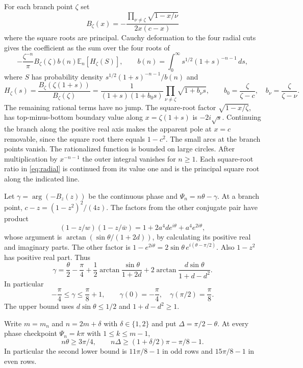 \documentclass[11pt]{article}
\begin{document}
For each branch point $\zeta$ set
\[
B_\zeta(x)=-\frac{\prod_{\nu\ne\zeta}\sqrt{1-x/\nu}}{2x(c-x)}
\]
where the square roots are principal. Cauchy deformation to the four radial cuts gives the coefficient as the sum over the four roots of
\[
-\frac{\zeta^{-n}}{\pi}B_\zeta(\zeta)b(n) \mathbb E_n[H_\zeta(S)],\qquad
b(n)=\int_0^\infty s^{1/2}(1+s)^{-n-1}\,ds,
\]
where $S$ has probability density $s^{1/2}(1+s)^{-n-1}/b(n)$ and
\begin{equation}
H_\zeta(s)=\frac{B_\zeta(\zeta(1+s))}{B_\zeta(\zeta)}
=\frac{1}{(1+s)(1+b_0s)}
 \prod_{\nu\ne\zeta}\sqrt{1+b_\nu s},
\qquad b_0=\frac{\zeta}{\zeta-c},\quad b_\nu=\frac{\zeta}{\zeta-\nu}.
\label{eq:radial}
\end{equation}
The remaining rational terms have no jump. The square-root factor $\sqrt{1-x/\zeta}$, has top-minus-bottom boundary value along $x=\zeta(1+s)$ is $-2i\sqrt{s}$. Continuing the branch along the positive real axis makes the apparent pole at $x=c$ removable, since the square root there equals $1-c^2$. The small arcs at the branch points vanish. The rationalized function is bounded on large circles. After multiplication by $x^{-n-1}$ the outer integral vanishes for $n\ge1$. Each square-root ratio in \eqref{eq:radial} is continued from its value one and is the principal square root along the indicated line.

Let $\gamma=\arg(-B_z(z))$ be the continuous phase and $\Psi_n=n\theta-\gamma$. At a branch point, $c-z=(1-z^2)^2/(4z)$. The factors from the other conjugate pair have product
\[
(1-z/w)(1-z/\bar w)=1+2a^4d e^{i\theta}+a^4e^{2i\theta},
\]
whose argument is $\arctan(\sin\theta/(1+2d))$, by calculating its positive real and imaginary parts. The other factor is $1-e^{2i\theta}=2\sin\theta\,e^{i(\theta-\pi/2)}$. Also $1-z^2$ has positive real part. Thus
\begin{equation}
\gamma=\frac{\theta}{2}-\frac{\pi}{4}
       +\frac12\arctan\frac{\sin\theta}{1+2d}
       +2\arctan\frac{d\sin\theta}{1+d-d^2}.
\label{eq:gamma}
\end{equation}
In particular
\[
-\frac{\pi}{4}\le\gamma\le \frac{\pi}{8}+1,\qquad
\gamma(0)=-\frac{\pi}{4},\quad
\gamma(\pi/2)=\frac{\pi}{8}.
\]
The upper bound uses $d\sin\theta\le1/2$ and $1+d-d^2\ge1$.

Write $m=m_n$ and $n=2m+\delta$ with $\delta\in\{1,2\}$ and put $\Delta=\pi/2-\theta$. At every phase checkpoint $\Psi_n=k\pi$ with $1\le k\le m-1$,
\begin{equation}
n\theta\ge3\pi/4,\qquad
n\Delta\ge(1+\delta/2)\pi-\pi/8-1 .
\label{eq:node}
\end{equation}
In particular the second lower bound is $11\pi/8-1$ in odd rows and $15\pi/8-1$ in even rows.
\end{document}
